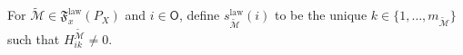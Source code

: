 For \(\widetilde{\mathcal M}\in\mathfrak F_x^{\mathrm{law}}(P_X)\) and \(i\in\mathsf O\), define \(s_{\widetilde{\mathcal M}}^{\mathrm{law}}(i)\) to be the unique \(k\in\{1,\ldots,m_{\widetilde{\mathcal M}}\}\) such that \(H^{\widetilde{\mathcal M}}_{ik}\ne0\).